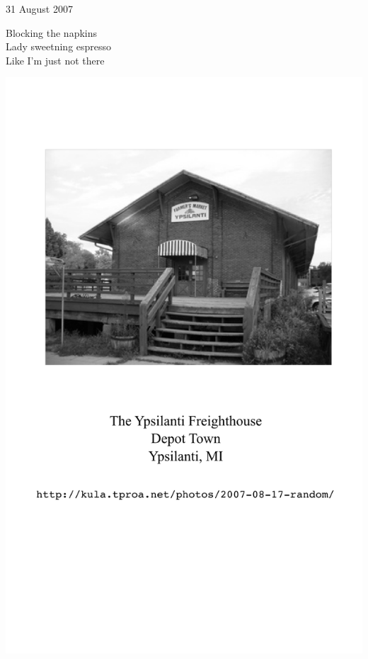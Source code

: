 \documentclass[12pt]{article}
\begin{document}
31 August 2007

Blocking the napkins \\
Lady sweetning espresso \\
Like I'm just not there


\newpage

\includegraphics{back.png}

\newpage
\end{document}
